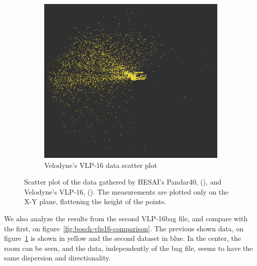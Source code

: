 \begin{figure}[ht!]
\begin{subfigure}[t]{0.45\textwidth}
		\includegraphics[width=\textwidth]{img/bosch/vlp16-test1.png}
		\caption{Velodyne's VLP-16 data scatter plot}
		\label{fig:bosch-vlp16-1}
	\end{subfigure}
	\caption{Scatter plot of the data gathered by HESAI's Pandar40, (), and Velodyne's VLP-16, (). The measurements are plotted only on the X-Y plane, flattening the height of the points.}
	\label{fig:bosch-pandar-vs-vlp16}
\end{figure}

We also analyze the results from the second VLP-16bag file, and compare with the first, on figure~\ref{fig:bosch-vlp16-comparison}. The previous shown data, on figure~\ref{fig:bosch-vlp16-1} is shown in yellow and the second dataset in blue. In the center, the room can be seen, and the data, independently of the bag file, seems to have the same dispersion and directionality.

